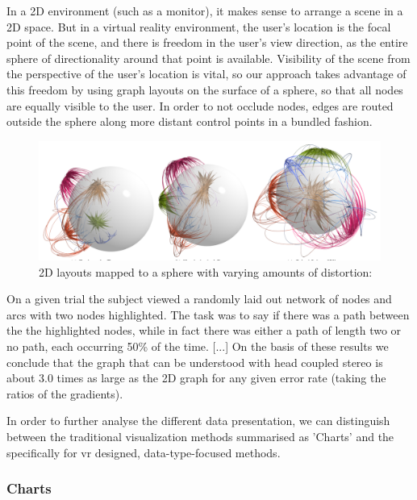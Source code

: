 In a 2D environment (such as a monitor), it makes sense to arrange a scene in a 2D space. But in a virtual reality environment, the user’s location is the focal point of the scene, and there is freedom in the user’s view direction, as the entire sphere of directionality around that point is available. Visibility of the scene from the perspective of the user’s location is vital, so our approach takes advantage of this freedom by using graph layouts on the surface of a sphere, so that all nodes are equally visible to the user. In order to not occlude nodes, edges are routed outside the sphere along more distant control points in a bundled fashion.
\cite{Kwon2015}

\begin{figure}[h]
	\begin{center}
		\includegraphics[width=14cm]{03_Figures/05_LitReview/Kwon2015_SphericalGraphLayout.png}
		\caption[2D layouts mapped to a sphere with varying amounts of distortion]{2D layouts mapped to a sphere with varying amounts of distortion:  \citep{Kwon2015}}
		\label{fig:sphericalgraph}
	\end{center}
\end{figure}

On a given trial the subject viewed a randomly laid out network of nodes and arcs with two nodes highlighted. The task was to say if there was a path between the the highlighted nodes, while in fact there was either a path of length two or no path, each occurring 50\% of the time. [...]
On the basis of these results we conclude that the graph that can be understood with head coupled stereo is about 3.0 times as large as the 2D graph for any given error rate (taking the ratios of the gradients).
\cite{Ware1994}



In order to further analyse the different data presentation, we can distinguish between the traditional visualization methods summarised as 'Charts' and the specifically for \gls{vr} designed, data-type-focused methods.


\subsubsection{Charts}

